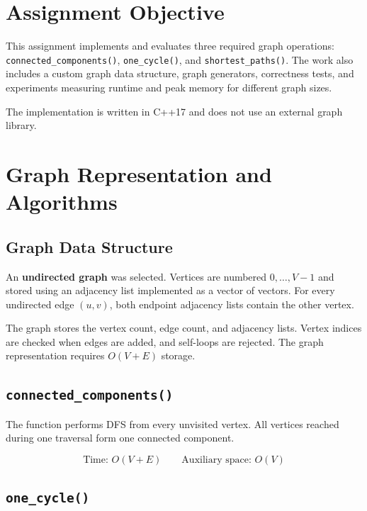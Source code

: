 \documentclass[11pt]{article}
\newcommand{\code}[1]{\texttt{#1}}
\begin{document}
\section{Assignment Objective}

This assignment implements and evaluates three required graph operations:
\code{connected\_components()}, \code{one\_cycle()}, and
\code{shortest\_paths()}. The work also includes a custom graph data
structure, graph generators, correctness tests, and experiments measuring
runtime and peak memory for different graph sizes.

The implementation is written in C++17 and does not use an external graph
library.

\section{Graph Representation and Algorithms}

\subsection{Graph Data Structure}

An \textbf{undirected graph} was selected. Vertices are numbered
$0,\ldots,V-1$ and stored using an adjacency list implemented as a vector of
vectors. For every undirected edge $(u,v)$, both endpoint adjacency lists
contain the other vertex.

The graph stores the vertex count, edge count, and adjacency lists. Vertex
indices are checked when edges are added, and self-loops are rejected. The
graph representation requires $O(V+E)$ storage.

\subsection{\code{connected\_components()}}

The function performs DFS from every unvisited vertex. All vertices reached
during one traversal form one connected component.

\[
\text{Time: }O(V+E)
\qquad
\text{Auxiliary space: }O(V)
\]

\subsection{\code{one\_cycle()}}
\end{document}
